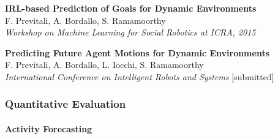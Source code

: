 \begin{frame}
	\tiny
	
	\textbf{IRL-based Prediction of Goals for Dynamic Environments}\\
	F. Previtali, A. Bordallo, S. Ramamoorthy \\
	\emph{Workshop on Machine Learning for Social Robotics at ICRA, 2015} \\
	
	\vspace{0.1cm}
	
	\textbf{Predicting Future Agent Motions for Dynamic Environments}\\
	F. Previtali, A. Bordallo, L. Iocchi, S. Ramamoorthy \\
	\emph{International Conference on Intelligent Robots and Systems} [submitted] \\
\end{frame}

\begin{frame}
	\frametitle{Quantitative Evaluation}
	\framesubtitle{Activity Forecasting}
	
	\begin{figure}
		\centering
	\end{figure}
\end{frame}

%	

